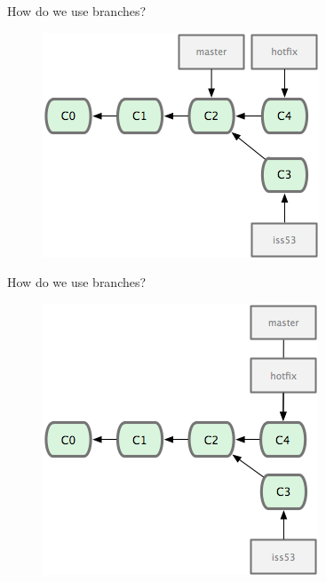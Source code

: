 \documentclass[14pt]{beamer}
\begin{document}
\begin{frame}{How do we use branches?}
	\begin{figure}[htb]
		\centering
		\includegraphics[width=.7\textwidth]{hotfix.png}
	\end{figure}
\end{frame}

\begin{frame}{How do we use branches?}
	\begin{figure}[htb]
		\centering
		\includegraphics[width=.7\textwidth]{hotfix2.png}
	\end{figure}
\end{frame}
\end{document}
